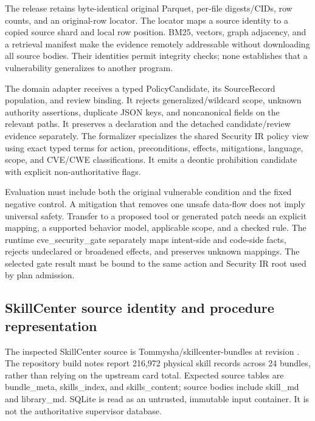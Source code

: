 \documentclass{article}
\begin{document}
The release retains byte-identical original Parquet, per-file digests/CIDs, row counts, and an original-row locator. The locator maps a source identity to a copied source shard and local row position. BM25, vectors, graph adjacency, and a retrieval manifest make the evidence remotely addressable without downloading all source bodies. Their identities permit integrity checks; none establishes that a vulnerability generalizes to another program.

The domain adapter receives a typed PolicyCandidate, its SourceRecord population, and review binding. It rejects generalized/wildcard scope, unknown authority assertions, duplicate JSON keys, and noncanonical fields on the relevant paths. It preserves a declaration and the detached candidate/review evidence separately. The formalizer specializes the shared Security IR policy view using exact typed terms for action, preconditions, effects, mitigations, language, scope, and CVE/CWE classifications. It emits a deontic prohibition candidate with explicit non-authoritative flags.

Evaluation must include both the original vulnerable condition and the fixed negative control. A mitigation that removes one unsafe data-flow does not imply universal safety. Transfer to a proposed tool or generated patch needs an explicit mapping, a supported behavior model, applicable scope, and a checked rule. The runtime cve\_\allowbreak{}security\_\allowbreak{}gate separately maps intent-side and code-side facts, rejects undeclared or broadened effects, and preserves unknown mappings. The selected gate result must be bound to the same action and Security IR root used by plan admission.

\subsection{SkillCenter source identity and procedure representation}

The inspected SkillCenter source is Tommysha/skillcenter-bundles at revision . The repository build notes report 216,972 physical skill records across 24 bundles, rather than relying on the upstream card total. Expected source tables are bundle\_\allowbreak{}meta, skills\_\allowbreak{}index, and skills\_\allowbreak{}content; source bodies include skill\_\allowbreak{}md and library\_\allowbreak{}md. SQLite is read as an untrusted, immutable input container. It is not the authoritative supervisor database.
\end{document}
